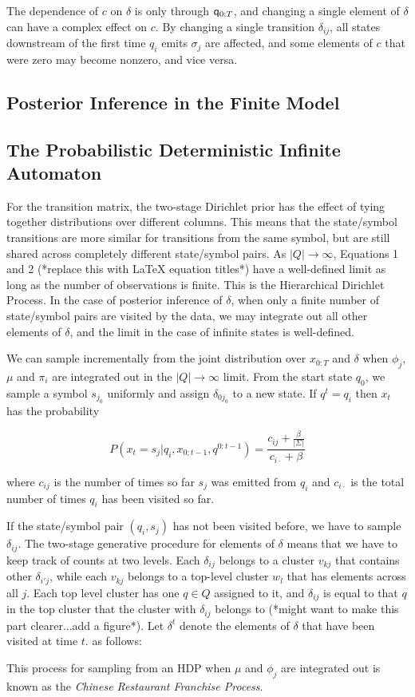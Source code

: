  The dependence of $c$ on $\delta$ is only through $\q_{0:T}$, and changing a single element of $\delta$ can have a complex effect on $c$.  By changing a single transition $\delta_{ij}$, all states downstream of the first time $q_i$ emits $\sigma_j$ are affected, and some elements of $c$ that were zero may become nonzero, and vice versa.
 
 \subsection{Posterior Inference in the Finite Model}
 
 \subsection{The Probabilistic Deterministic Infinite Automaton}
 
 For the transition matrix, the two-stage Dirichlet prior has the effect of tying together distributions over different columns.  This means that the state/symbol transitions are more similar for transitions from the same symbol, but are still shared across completely different state/symbol pairs.  As $|Q|\rightarrow\infty$, Equations 1 and 2 (*replace this with LaTeX equation titles*) have a well-defined limit as long as the number of observations is finite.  This is the Hierarchical Dirichlet Process.  In the case of posterior inference of $\delta$, when only a finite number of state/symbol pairs are visited by the data, we may integrate out all other elements of $\delta$, and the limit in the case of infinite states is well-defined.
 
We can sample incrementally from the joint distribution over $x_{0:T}$ and $\delta$ when $\phi_j$, $\mu$ and $\pi_i$ are integrated out in the $|Q|\rightarrow\infty$ limit.  From the start state $q_0$, we sample a symbol $s_{j_0}$ uniformly and assign $\delta_{0j_0}$ to a new state.  If $q^t = q_i$ then $x_t$ has the probability

 \[P(x_t=s_j|q_i,x_{0:t-1},q^{0:t-1}) = \frac{c_{ij}+\frac{\beta}{|\Sigma|}}{c_{i\cdot} + \beta}\]
 
 where $c_{ij}$ is the number of times so far $s_j$ was emitted from $q_i$ and $c_{i\cdot}$ is the total number of times $q_i$ has been visited so far.  
 
If the state/symbol pair $(q_i,s_j)$ has not been visited before, we have to sample $\delta_{ij}$.  The two-stage generative procedure for elements of $\delta$ means that we have to keep track of counts at two levels.  Each $\delta_{ij}$ belongs to a cluster $v_{kj}$ that contains other $\delta_{i'j}$, while each $v_{kj}$ belongs to a top-level cluster $w_{l}$ that has elements across all $j$.  Each top level cluster has one $q \in Q$ assigned to it, and $\delta_{ij}$ is equal to that $q$ in the top cluster that the cluster with $\delta_{ij}$ belongs to (*might want to make this part clearer...add a figure*).  Let $\delta^t$ denote the elements of $\delta$ that have been visited at time $t$.  as follows:
 
 
 This process for sampling from an HDP when $\mu$ and $\phi_j$ are integrated out is known as the {\em Chinese Restaurant Franchise Process}.